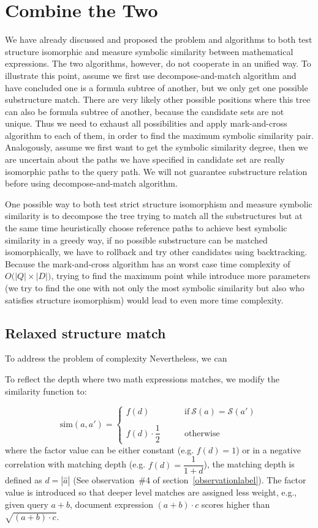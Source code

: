 \section{Combine the Two}
We have already discussed and proposed the problem and algorithms to both test structure isomorphic and measure symbolic similarity between mathematical expressions. The two algorithms, however, do not cooperate in an unified way. 
To illustrate this point, assume we first use decompose-and-match algorithm and have concluded one is a formula subtree of another, but we only get one possible substructure match. 
There are very likely other possible positions where this tree can also be formula subtree of another, because the candidate sets are not unique. 
Thus we need to exhaust all possibilities and apply mark-and-cross algorithm to each of them, in order to find the maximum symbolic similarity pair. 
Analogously, assume we first want to get the symbolic similarity degree, then we are uncertain about the paths we have specified in candidate set are really isomorphic paths to the query path. 
We will not guarantee substructure relation before using decompose-and-match algorithm.

One possible way to both test strict structure isomorphism and measure symbolic similarity is to decompose the tree trying to match all the substructures but at the same time heuristically choose reference paths to achieve best symbolic similarity in a greedy way, if no possible substructure can be matched isomorphically, we have to rollback and try other candidates using backtracking.
Because the mark-and-cross algorithm has an worst case time complexity of $O\big(|Q| \times |D|\big)$,
trying to find the maximum point while introduce more parameters (we try to find the one with not only the most symbolic similarity but also who satisfies structure isomorphism) would lead to even more time complexity. 

\subsection{Relaxed structure match}
To address the problem of complexity
Nevertheless, we can

To reflect the depth where two math expressions matches,  we modify the similarity function to:

$$
\mathrm{sim}(a,a') = 
\left\{
\begin{array}{ll}
f(d)   &\qquad \mathrm{if}\  \mathcal{S}(a) = \mathcal{S}(a')
\\
\\
f(d) \cdot \dfrac 1 2  &\qquad \mathrm{otherwise}
\end{array}
\right.
$$
where the factor value can be either constant (e.g. $f(d)=1$) or in a negative correlation with matching depth (e.g. $f(d) = \dfrac{1}{1 + d}$), 
the matching depth is defined as $d = |\hat{a}|$ (See observation~\#4 of section~\ref{observationlabel}).
The factor value is introduced so that deeper level matches are assigned less weight, e.g., given query $a+b$, document expression $(a+b)\cdot c$ scores higher than $\sqrt{(a+b)\cdot c}$.

